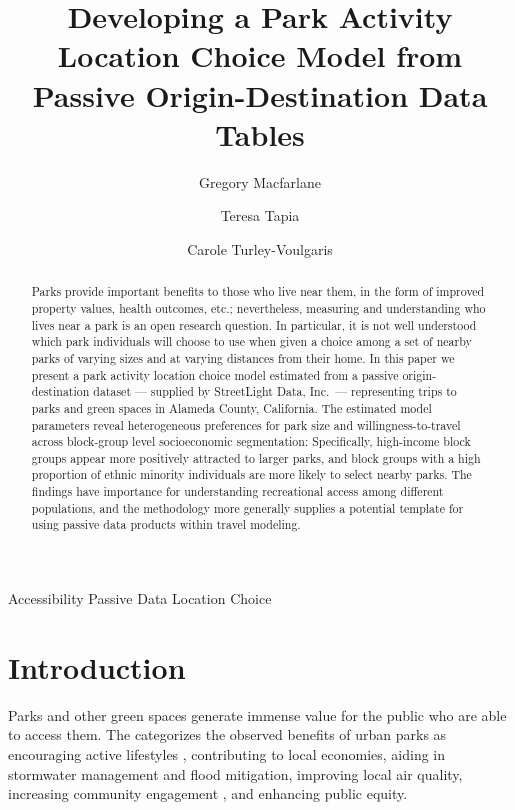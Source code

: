 \documentclass[]{elsarticle} %
\begin{document}
\begin{frontmatter}

  \title{Developing a Park Activity Location Choice Model from Passive Origin-Destination Data Tables}
    \author[Brigham Young University]{Gregory Macfarlane}
    \author[]{Teresa Tapia}
    \author[Harvard University]{Carole Turley-Voulgaris}
      \address[Brigham Young University]{Civil and Environmental Engineering Department, 430 Engineering Building, Provo, Utah 84602}
    \address[Harvard University]{Some Other Place}
  
  \begin{abstract}
  Parks provide important benefits to those who live near them, in the form of improved property values, health outcomes, etc.; nevertheless, measuring and understanding who lives near a park is an open research question. In particular, it is not well understood which park individuals will choose to use when given a choice among a set of nearby parks of varying sizes and at varying distances from their home. In this paper we present a park activity location choice model estimated from a passive origin-destination dataset --- supplied by StreetLight Data, Inc.~--- representing trips to parks and green spaces in Alameda County, California. The estimated model parameters reveal heterogeneous preferences for park size and willingness-to-travel across block-group level socioeconomic segmentation: Specifically, high-income block groups appear more positively attracted to larger parks, and block groups with a high proportion of ethnic minority individuals are more likely to select nearby parks. The findings have importance for understanding recreational access among different populations, and the methodology more generally supplies a potential template for using passive data products within travel modeling.
  \end{abstract}
   \begin{keyword} Accessibility Passive Data Location Choice\end{keyword}
 \end{frontmatter}

\hypertarget{intro}{%
\section{Introduction}\label{intro}}

Parks and other green spaces generate immense value for the public who are able
to access them. The \citet{CityParksAlliance} categorizes the observed benefits of
urban parks as encouraging active lifestyles \citep{Bancroft2015}, contributing to
local economies, aiding in stormwater management and flood mitigation,
improving local air quality, increasing community engagement \citep{Madzia2018}, and
enhancing public equity.
\end{document}
